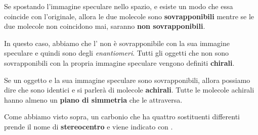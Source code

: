 Se spostando l'immagine speculare nello spazio, e esiste un modo che essa coincide con l'originale, allora le due molecole sono \textbf{sovrapponibili} mentre se le due molecole non coincidono mai, saranno \textbf{non sovrapponibili}.

In questo caso, abbiamo che l' non è sovrapponibile con la sua immagine speculare e quindi sono degli \textit{enantiomeri}. Tutti gli oggetti che non sono sovrapponibili con la propria immagine speculare vengono definiti \textbf{chirali}.

Se un oggetto e la sua immagine speculare sono sovrapponibili, allora possiamo dire che sono identici e si parlerà di molecole \textbf{achirali}. Tutte le molecole achirali hanno almeno un \textbf{piano di simmetria} che le attraversa.

Come abbiamo visto sopra, un carbonio che ha quattro sostituenti differenti prende il nome di \textbf{stereocentro} e viene indicato con .

